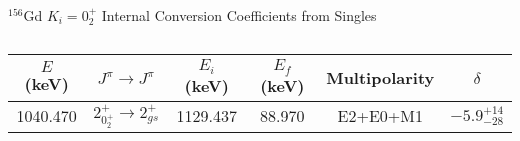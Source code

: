 \begin{table}
    \centering
    \caption{$^{156}$Gd $K_i=0^+_2$ Internal Conversion Coefficients from Singles}
        \label{tab:156Gd_Single_02_Disc}
\begin{ThreePartTable}
    \begin{subtable}{\textwidth}
        \caption{}
    \begin{tabular}{c|c|c|c|c|c}
        \toprule
        $E$ (keV)	&	$J^{\pi}	\rightarrow	J^{\pi}$	&	$E_i$ (keV)	&	$E_f$ (keV)	&	Multipolarity	&	$\delta$ \\
        \hline
        1040.470	&	$2^+_{0^+_{2}}	\rightarrow	2^+_{gs}$	&	1129.437	&	88.970	&	E2+E0+M1	&	$-5.9^{+14}_{-28}$\\ 
	    \bottomrule
    \end{tabular}
    \end{subtable}
    \end{ThreePartTable}
\end{table}
